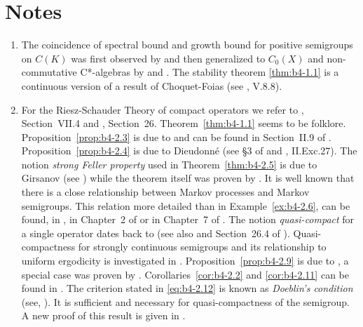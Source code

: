 \section*{Notes}

\begin{enumerate}[label=\emph{Section \arabic*:}, wide, itemsep=1ex]

\item
 The coincidence of spectral bound and growth bound for positive semigroups on $C(K)$ was first observed by \citet{derndinger:1980} and then generalized to $C_0(X)$ and non-commutative C*-algebras by \citet{battydavies:1983} and \citet{grohneubrander:1981}. 
The stability theorem \ref{thm:b4-1.1} is a continuous version of a result of Choquet-Foias (see \citet{schaefer:1974}, V.8.8).

\item
 For the Riesz-Schauder Theory of compact operators we refer to \citet{dunfordschwartz:1958}, Section~VII.4 and \citet{pietsch:1978}, Section~26. 
Theorem~\ref{thm:b4-1.1} seems to be folklore. Proposition~\ref{prop:b4-2.3} is due to \citet{grothendieck:1953} and can be found in Section~II.9 of \citet{schaefer:1974}. Proposition~\ref{prop:b4-2.4} is due to Dieudonné (see §3 of \citet{grothendieck:1953} and \citet{schaefer:1974}, II.Exc.27). The notion \emph{strong Feller property} used in Theorem~\ref{thm:b4-2.5} is due to Girsanov (see \citet{dynkin:1965}) while the theorem itself was proven by \citet{davies:1982}. 
It is well known that there is a close relationship between Markov processes and Markov semigroups. 
This relation more detailed than in Example~\ref{ex:b4-2.6}, can be found, \eg in \citet{dynkin:1965}, in Chapter~2 of \citet{vancasteren:1985} or in Chapter~7 of \citet{lamperti:1977}. 
The notion \emph{quasi-compact} for a single operator dates back to \citet{eberlein:1948} (see also \citet{yosidakakutani:1941} and Section~26.4 of \citet{pietsch:1978}). 
Quasi-compactness for strongly continuous semigroups and its relationship to uniform ergodicity is investigated in \citet{lin:1975}. 
Proposition~\ref{prop:b4-2.9} is due to \citet{voigt:1980}, a special case was proven by \citet{vidav:1970}. 
Corollaries~\ref{cor:b4-2.2} and \ref{cor:b4-2.11} can be found in   \citet{greiner:1984}.
The criterion stated in \eqref{eq:b4-2.12} is known as \emph{Doeblin's condition} (see, \eg \citet{yosidakakutani:1941}). It is sufficient and
necessary for quasi-compactness of the semigroup. 
A new proof of this result is given in \citet{lotz:1981}.


\end{enumerate}
